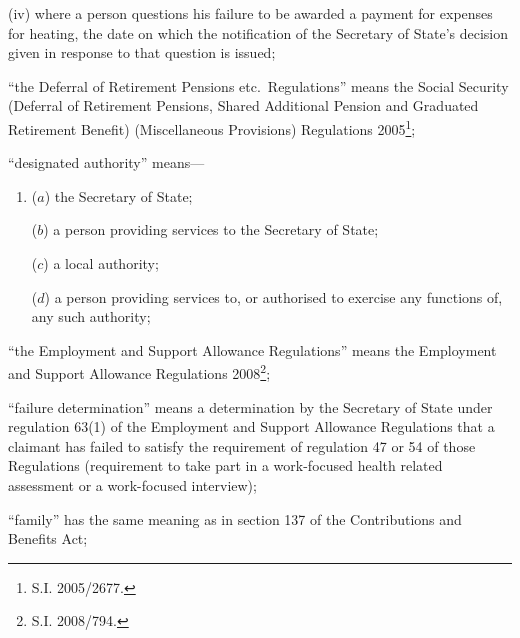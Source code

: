 \documentclass[12pt,a4paper]{article}
\begin{document}
\begin{enumerate}
\begin{enumerate}
\begin{enumerate}
(iv) where a person questions his failure to be awarded a payment for expenses for heating, the date on which the notification of the Secretary of State’s decision given in response to that question is issued;
\end{enumerate}
\end{enumerate}

“the Deferral of Retirement Pensions etc.\ Regulations” means the Social Security (Deferral of Retirement Pensions, Shared Additional Pension and Graduated Retirement Benefit) (Miscellaneous Provisions) Regulations 2005\footnote{S.I. 2005/2677.};


“designated authority” means—
\begin{enumerate}\item[]
    ($a$)     the Secretary of State;

    ($b$) 
    a person providing services to the Secretary of State;

    ($c$) 
    a local authority;

    ($d$) 
    a person providing services to, or authorised to exercise any functions of, any such authority;
\end{enumerate}

“the Employment and Support Allowance Regulations” means the Employment and Support Allowance Regulations 2008\footnote{S.I. 2008/794.};

“failure determination” means a determination by the Secretary of State under regulation 63(1) of the Employment and Support Allowance Regulations that a claimant has failed to satisfy the requirement of regulation 47 or 54 of those Regulations (requirement to take part in a work-focused health related assessment or a work-focused interview);

“family” has the same meaning as in section 137 of the Contributions and Benefits Act;


\end{enumerate}
\end{document}
